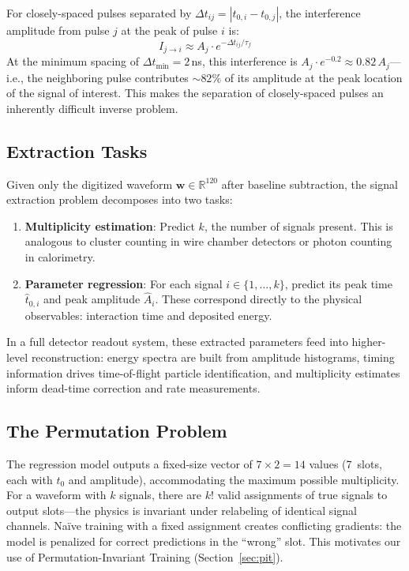 \documentclass[11pt,twocolumn]{article}
\begin{document}
For closely-spaced pulses separated by $\Delta t_{ij} = |t_{0,i} - t_{0,j}|$, the interference amplitude from pulse $j$ at the peak of pulse $i$ is:
\begin{equation}
    I_{j \to i} \approx A_j \cdot e^{-\Delta t_{ij}/\tau_f}
\end{equation}
At the minimum spacing of $\Delta t_{\min} = 2$\,ns, this interference is $A_j \cdot e^{-0.2} \approx 0.82\,A_j$---i.e., the neighboring pulse contributes ${\sim}82\%$ of its amplitude at the peak location of the signal of interest.
This makes the separation of closely-spaced pulses an inherently difficult inverse problem.

\subsection{Extraction Tasks}

Given only the digitized waveform $\mathbf{w} \in \mathbb{R}^{120}$ after baseline subtraction, the signal extraction problem decomposes into two tasks:
\begin{enumerate}
    \item \textbf{Multiplicity estimation}: Predict $k$, the number of signals present. This is analogous to cluster counting in wire chamber detectors or photon counting in calorimetry.
    \item \textbf{Parameter regression}: For each signal $i \in \{1, \ldots, k\}$, predict its peak time $\hat{t}_{0,i}$ and peak amplitude $\hat{A}_i$. These correspond directly to the physical observables: interaction time and deposited energy.
\end{enumerate}

In a full detector readout system, these extracted parameters feed into higher-level reconstruction: energy spectra are built from amplitude histograms, timing information drives time-of-flight particle identification, and multiplicity estimates inform dead-time correction and rate measurements.

\subsection{The Permutation Problem}

The regression model outputs a fixed-size vector of $7 \times 2 = 14$ values (7~slots, each with $t_0$ and amplitude), accommodating the maximum possible multiplicity.
For a waveform with $k$ signals, there are $k!$ valid assignments of true signals to output slots---the physics is invariant under relabeling of identical signal channels.
Na\"ive training with a fixed assignment creates conflicting gradients: the model is penalized for correct predictions in the ``wrong'' slot.
This motivates our use of Permutation-Invariant Training (Section~\ref{sec:pit}).
\end{document}
